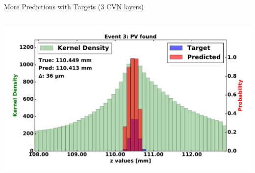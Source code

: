 \begin{frame}{More Predictions with Targets (3 CVN layers)}
\begin{columns}[c]
\begin{center}
           \includegraphics[width=1\textwidth, height=0.45\textwidth, trim=18 0 18 0]{images/120000_3layer_19.pdf}
       \end{center}
  \end{columns}
\end{frame}

